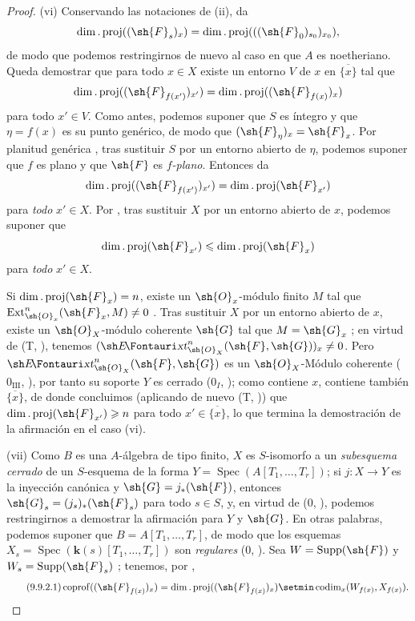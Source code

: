 \begin{proof}
(vi) Conservando las notaciones de (ii),  da
\[
  \dim.\operatorname{proj}((\sh{F}_s)_x)
  =\dim.\operatorname{proj}(((\sh{F}_0)_{s_0})_{x_0}),
\]
de modo que podemos restringirnos de nuevo al caso en que $A$ es noetheriano. Queda demostrar que para todo $x\in X$ existe un entorno $V$ de $x$ en $\overline{\{x\}}$ tal que
\[
  \dim.\operatorname{proj}((\sh{F}_{f(x')})_{x'})
  =\dim.\operatorname{proj}((\sh{F}_{f(x)})_x)
\]
para todo $x'\in V$. Como antes, podemos suponer que $S$ es íntegro y que $\eta=f(x)$ es su punto genérico, de modo que $(\sh{F}_\eta)_x=\sh{F}_x$. Por planitud genérica , tras sustituir $S$ por un entorno abierto de $\eta$, podemos suponer que $f$ es plano y que $\sh{F}$ es \emph{$f$-plano}. Entonces  da
\[
  \dim.\operatorname{proj}((\sh{F}_{f(x')})_{x'})
  =\dim.\operatorname{proj}(\sh{F}_{x'})
\]
para \emph{todo} $x'\in X$. Por , tras sustituir $X$ por un entorno abierto de $x$, podemos suponer que
\[
  \dim.\operatorname{proj}(\sh{F}_{x'})
  \leqslant\dim.\operatorname{proj}(\sh{F}_x)
\]
para \emph{todo} $x'\in X$.

Si $\dim.\operatorname{proj}(\sh{F}_x)=n$, existe un $\sh{O}_x$-módulo finito $M$ tal que $\operatorname{Ext}^n_{\sh{O}_x}(\sh{F}_x,M)\neq 0$ .
Tras sustituir $X$ por un entorno abierto de $x$, existe un $\sh{O}_X$-módulo coherente $\sh{G}$ tal que $M=\sh{G}_x$ ;
en virtud de (T, ), tenemos $(\shExt^n_{\sh{O}_X}(\sh{F},\sh{G}))_x\neq 0$.
Pero $\shExt^n_{\sh{O}_X}(\sh{F},\sh{G})$ es un $\sh{O}_X$-Módulo coherente ($0_{\mathrm{III}}$, ), por tanto su soporte $Y$ es cerrado ($0_I$, ); como contiene $x$, contiene también $\overline{\{x\}}$, de donde concluimos (aplicando de nuevo (T, )) que $\dim.\operatorname{proj}(\sh{F}_{x'})\geqslant n$ para todo $x'\in\overline{\{x\}}$, lo que termina la demostración de la afirmación en el caso (vi).

(vii) Como $B$ es una $A$-álgebra de tipo finito, $X$ es $S$-isomorfo a un \emph{subesquema cerrado} de un $S$-esquema de la forma $Y=\operatorname{Spec}(A[T_1,\ldots,T_r])$; si $j:X\to Y$ es la inyección canónica y $\sh{G}=j_*(\sh{F})$, entonces $\sh{G}_s=(j_s)_*(\sh{F}_s)$ para todo $s\in S$, y, en virtud de ($0$, ), podemos restringirnos a demostrar la afirmación para $Y$ y $\sh{G}$.
En otras palabras, podemos suponer que $B=A[T_1,\ldots,T_r]$, de modo que los esquemas $X_s=\operatorname{Spec}(\boldsymbol{k}(s)[T_1,\ldots,T_r])$ son \emph{regulares} ($0$, ).
Sea $W=\operatorname{Supp}(\sh{F})$ y $W_s=\operatorname{Supp}(\sh{F}_s)$ ; tenemos, por ,
\begin{equation}
\tag{9.9.2.1}
\label{IV.9.9.2.1}
  \operatorname{coprof}((\sh{F}_{f(x)})_x)=\dim.\operatorname{proj}((\sh{F}_{f(x)})_x)\setmin\operatorname{codim}_x(W_{f(x)},X_{f(x)}).
\end{equation}


\end{proof}
